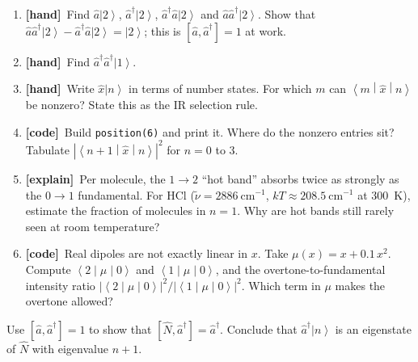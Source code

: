 \documentclass[11pt]{article}
\newif\ifsolutions
\newcommand{\tagbox}[2]{\textcolor{#1}{\textsf{\textbf{[#2]}}}}
\newcommand{\hand}{\tagbox{handc}{hand}}
\newcommand{\code}{\tagbox{codec}{code}}
\newcommand{\expl}{\tagbox{explc}{explain}}
\newcommand{\ans}[1]{\ifsolutions\par\noindent\hspace*{1.5em}\textcolor{ansc}{\small\textit{Answer:} #1}\fi}
\newcommand{\ket}[1]{\left|#1\right\rangle}
\newcommand{\mel}[3]{\left\langle#1\middle|#2\middle|#3\right\rangle}
\newcommand{\ad}{\hat{a}^{\dagger}}
\newcommand{\aop}{\hat{a}}
\newcommand{\Nop}{\hat{N}}
\newcommand{\xop}{\hat{x}}
\newcommand{\py}[1]{\texttt{#1}}
\begin{document}
\begin{enumerate}
\item \hand\ Find $\aop\ket2$, $\ad\ket2$, $\ad\aop\ket2$ and $\aop\ad\ket2$.
Show that $\aop\ad\ket2 - \ad\aop\ket2 = \ket2$; this is $[\aop,\ad] = 1$ at work.
\ans{$\sqrt2\ket1$, $\ \sqrt3\ket3$, $\ 2\ket2$, $\ 3\ket2$.}

\item \hand\ Find $\ad\ad\ket1$.
\ans{$\sqrt2\sqrt3\,\ket3 = \sqrt6\,\ket3$.}

\item \hand\ Write $\xop\ket n$ in terms of number states. For which $m$ can $\mel{m}{\xop}{n}$ be nonzero?
State this as the IR selection rule.
\ans{$\xop\ket n = \tfrac{1}{\sqrt2}\big(\sqrt n\ket{n-1} + \sqrt{n+1}\ket{n+1}\big)$, so only $m = n\pm1$: $\Delta n = \pm1$.}

\item \code\ Build \py{position(6)} and print it. Where do the nonzero entries sit?
Tabulate $|\mel{n+1}{\xop}{n}|^2$ for $n = 0$ to $3$.
\ans{Only on the first super- and sub-diagonals. $0.5,\ 1.0,\ 1.5,\ 2.0$, i.e.\ $(n+1)/2$.}

\item \expl\ Per molecule, the $1\to2$ ``hot band'' absorbs twice as strongly as the $0\to1$ fundamental.
For HCl ($\tilde\nu = 2886~\text{cm}^{-1}$, $kT \approx 208.5~\text{cm}^{-1}$ at 300~K), estimate the fraction of molecules in $n = 1$.
Why are hot bands still rarely seen at room temperature?
\ans{$e^{-2886/208.5} \approx 10^{-6}$. The per-molecule factor of 2 cannot compensate for a population a million times smaller.}

\item \code\ Real dipoles are not exactly linear in $x$. Take $\mu(x) = x + 0.1\,x^2$.
Compute $\mel{2}{\mu}{0}$ and $\mel{1}{\mu}{0}$, and the overtone-to-fundamental intensity ratio $|\mel{2}{\mu}{0}|^2/|\mel{1}{\mu}{0}|^2$.
Which term in $\mu$ makes the overtone allowed?
\ans{$\mel{2}{x^2}{0} = 1/\sqrt2$, so $\mel{2}{\mu}{0} = 0.0707$ and $\mel{1}{\mu}{0} = 1/\sqrt2$; ratio $= 0.010$. The $x^2$ term (electrical anharmonicity).}
\end{enumerate}

\begin{gradext}
Use $[\aop,\ad] = 1$ to show that $[\Nop, \ad] = \ad$.
Conclude that $\ad\ket n$ is an eigenstate of $\Nop$ with eigenvalue $n+1$.
\end{gradext}

\end{document}

